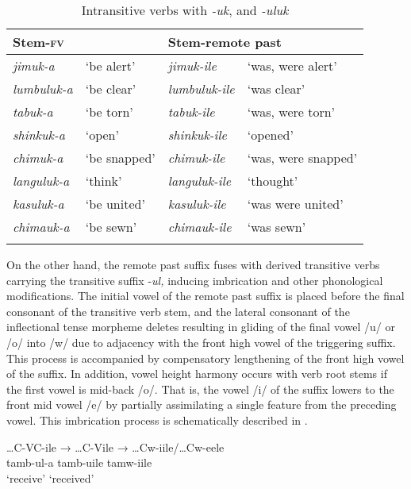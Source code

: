\documentclass[output=paper]{langsci/langscibook}
\begin{document}
\begin{table}
\begin{tabularx}{\textwidth}{XXll}
\lsptoprule
Stem-\textsc{fv} &  & \multicolumn{2}{l}{Stem-remote past} \\
\midrule
\textit{jimuk-a} & `be alert' & \textit{jimuk-ile} & `was, were alert' \\
\textit{lumbuluk-a} & `be clear' & \textit{lumbuluk-ile} & `was clear' \\
\textit{tabuk-a} & `be torn' & \textit{tabuk-ile} & `was, were torn' \\
\textit{shinkuk-a} & `open' & \textit{shinkuk-ile} & `opened' \\
\textit{chimuk-a} & `be snapped' & \textit{chimuk-ile} & `was, were snapped' \\
\textit{languluk-a} & `think' & \textit{languluk-ile} & `thought' \\
\textit{kasuluk-a} & `be united' & \textit{kasuluk-ile} & `was were united' \\
\textit{chimauk-a} & `be sewn' & \textit{chimauk-ile} & `was sewn' \\

\lspbottomrule
\end{tabularx}

\caption{Intransitive verbs with \textit{-uk}, and \textit{-uluk}}
\label{tab:22.kawasha}

\end{table}



On the other hand, the remote past suffix fuses with derived transitive verbs carrying the transitive suffix -\textit{ul,} inducing imbrication and other phonological modifications. The initial vowel of the remote past suffix is placed before the final consonant of the transitive verb stem, and the lateral consonant of the inflectional tense morpheme deletes resulting in gliding of the final vowel /u/ or /o/ into /w/ due to adjacency with the front high vowel of the triggering suffix. This process is accompanied by compensatory lengthening of the front high vowel of the suffix. In addition, vowel height harmony occurs with verb root stems if the first vowel is mid-back /o/. That is, the vowel /i/ of the suffix lowers to the front mid vowel /e/ by partially assimilating a single feature from the preceding vowel. This imbrication process is schematically described in .

\ea
\label{ex:7.kawasha}

\glll …C-VC-ile  →  …C-Vile  →  …Cw-iile/…Cw-eele \\
tamb-ul-a {}   tamb-uile {}   tamw-iile \\
‘receive’ {} {} {} ‘received’ \\
\end{document}
